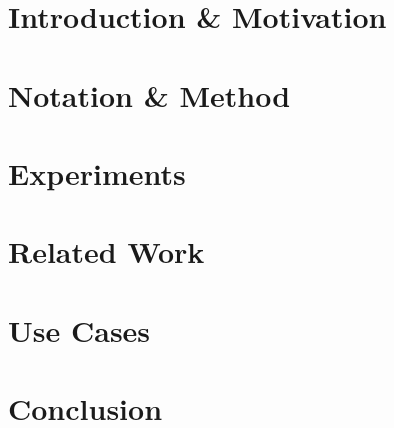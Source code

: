 \section{Introduction \& Motivation}\label{vivit::sec:introduction}


\section{Notation \& Method}\label{vivit::sec:method}


\section{Experiments}\label{vivit::sec:experiments}


\section{Related Work} \label{vivit::sec:related}


\section{Use Cases}\label{vivit::sec:use_cases}


\section{Conclusion}\label{vivit::sec:conclusion}


